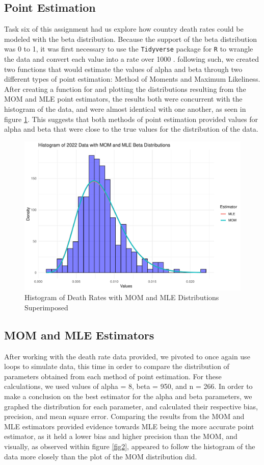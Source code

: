 \documentclass{article}\usepackage[]{graphicx}\usepackage[]{xcolor}
\begin{document}
\begin{multicols}{2}
\section{Point Estimation}
Task six of this assignment had us explore how country death rates could be modeled with the beta distribution. Because the support of the beta distribution was 0 to 1, it was first necessary to use the \texttt{Tidyverse} package for \texttt{R} to wrangle the data and convert each value into a rate over 1000 \citep{tidyverse}. following such, we created two functions that would estimate the values of alpha and beta through two different types of point estimation: Method of Moments and Maximum Likeliness. After creating a function for and plotting the distributions resulting from the MOM and MLE point estimators, the results both were concurrent with the histogram of the data, and were almost identical with one another, as seen in figure \ref{fig1}. This suggests that both methods of point estimation provided values for alpha and beta that were close to the true values for the distribution of the data.

\begin{figure}[H]
\includegraphics[scale=0.4]{Ptestdist.pdf}
\caption{Histogram of Death Rates with MOM and MLE Distributions Superimposed}
\label{fig1}
\end{figure}

\subsection{MOM and MLE Estimators}
After working with the death rate data provided, we pivoted to once again use loops to simulate data, this time in order to compare the distribution of parameters obtained from each method of point estimation. For these calculations, we used values of alpha = 8, beta = 950, and n = 266. In order to make a conclusion on the best estimator for the alpha and beta parameters, we graphed the distribution for each parameter, and calculated their respective bias, precision, and mean square error. Comparing the results from the MOM and MLE estimators provided evidence towards MLE being the more accurate point estimator, as it held a lower bias and higher precision than the MOM, and visually, as observed within figure \ref{fig2}, appeared to follow the histogram of the data more closely than the plot of the MOM distribution did.


\end{multicols}
\end{document}
